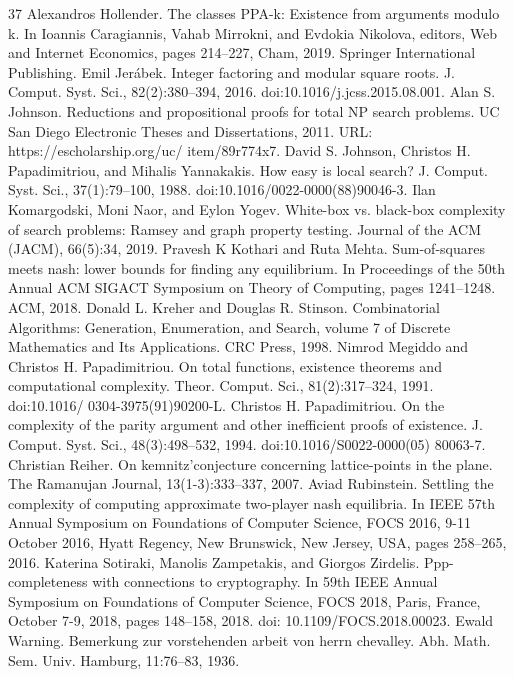 \begin{thebibliography}{37}
 Alexandros Hollender. The classes PPA-k: Existence from arguments modulo k. In Ioannis Caragiannis, Vahab Mirrokni, and Evdokia Nikolova, editors, Web and Internet Economics, pages 214–227, Cham, 2019. Springer International Publishing.
 Emil Jerábek. Integer factoring and modular square roots. J. Comput. Syst. Sci., 82(2):380–394, 2016. doi:10.1016/j.jcss.2015.08.001.
 Alan S. Johnson. Reductions and propositional proofs for total NP search problems. UC San Diego Electronic Theses and Dissertations, 2011. URL: https://escholarship.org/uc/ item/89r774x7.
 David S. Johnson, Christos H. Papadimitriou, and Mihalis Yannakakis. How easy is local search? J. Comput. Syst. Sci., 37(1):79–100, 1988. doi:10.1016/0022-0000(88)90046-3.
 Ilan Komargodski, Moni Naor, and Eylon Yogev. White-box vs. black-box complexity of search problems: Ramsey and graph property testing. Journal of the ACM (JACM), 66(5):34, 2019.
 Pravesh K Kothari and Ruta Mehta. Sum-of-squares meets nash: lower bounds for finding any equilibrium. In Proceedings of the 50th Annual ACM SIGACT Symposium on Theory of Computing, pages 1241–1248. ACM, 2018.
 Donald L. Kreher and Douglas R. Stinson. Combinatorial Algorithms: Generation, Enumeration, and Search, volume 7 of Discrete Mathematics and Its Applications. CRC Press, 1998.
 Nimrod Megiddo and Christos H. Papadimitriou. On total functions, existence theorems and computational complexity. Theor. Comput. Sci., 81(2):317–324, 1991. doi:10.1016/ 0304-3975(91)90200-L.
 Christos H. Papadimitriou. On the complexity of the parity argument and other inefficient proofs of existence. J. Comput. Syst. Sci., 48(3):498–532, 1994. doi:10.1016/S0022-0000(05) 80063-7.
 Christian Reiher. On kemnitz’conjecture concerning lattice-points in the plane. The Ramanujan Journal, 13(1-3):333–337, 2007.
 Aviad Rubinstein. Settling the complexity of computing approximate two-player nash equilibria. In IEEE 57th Annual Symposium on Foundations of Computer Science, FOCS 2016, 9-11 October 2016, Hyatt Regency, New Brunswick, New Jersey, USA, pages 258–265, 2016.
 Katerina Sotiraki, Manolis Zampetakis, and Giorgos Zirdelis. Ppp-completeness with connections to cryptography. In 59th IEEE Annual Symposium on Foundations of Computer Science, FOCS 2018, Paris, France, October 7-9, 2018, pages 148–158, 2018. doi: 10.1109/FOCS.2018.00023.
 Ewald Warning. Bemerkung zur vorstehenden arbeit von herrn chevalley. Abh. Math. Sem. Univ. Hamburg, 11:76–83, 1936.
\end{thebibliography}
